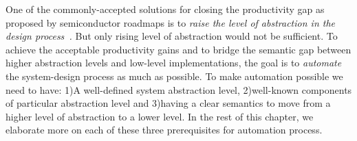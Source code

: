 One of the commonly-accepted solutions for closing the productivity gap as proposed by semiconductor roadmaps is to \emph{raise the level of abstraction in the design process~\cite{itrs}.}
But only rising level of abstraction would not be sufficient.
To achieve the acceptable productivity gains and to bridge the semantic gap between higher abstraction levels and low-level implementations, the goal is to \emph{automate} the system-design process as much as possible.
To make automation possible we need to have: 1)A well-defined system abstraction level, 2)well-known components of particular abstraction level and 3)having a clear semantics to move from a higher level of abstraction to a lower level.
In the rest of this chapter, we elaborate more on each of these three prerequisites for automation process.